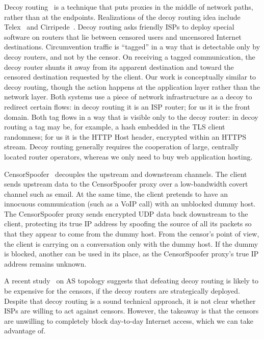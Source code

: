 \documentclass{article}
\begin{document}
Decoy routing~\cite{decoyrouting} is a technique that puts
proxies in the middle of network paths, rather than at the endpoints.
Realizations of the decoy routing idea include Telex~\cite{telex}
and Cirripede~\cite{cirripede}.
Decoy routing asks friendly ISPs to deploy special software on routers that lie
between censored users and uncensored Internet destinations.
Circumvention traffic is ``tagged'' in a way that is detectable only
by decoy routers, and not by the censor.
On receiving a tagged communication, the decoy router shunts it away from its apparent destination
and toward the censored destination requested by the client.
Our work is conceptually similar to decoy routing,
though the action happens at the application layer rather than the network layer.
Both systems use a piece of network infrastructure as a decoy to redirect certain flows:
in decoy routing it is an ISP router; for us it is the front domain.
Both tag flows in a way that is visible only to the decoy router:
in decoy routing a tag may be, for example, a hash embedded in the TLS client randomness;
for us it is the HTTP Host header, encrypted within an HTTPS stream.
Decoy routing generally requires the cooperation of large, centrally located
router operators,
whereas we only need to buy web application hosting.

CensorSpoofer~\cite{censorspoofer}
decouples the upstream and downstream channels.
The client sends upstream data to the CensorSpoofer proxy over a low-bandwidth covert channel such as email.
At the same time, the client pretends to have an innocuous communication (such as a VoIP call) with an unblocked dummy host.
The CensorSpoofer proxy sends encrypted UDP data back downstream to the client,
protecting its true IP address by spoofing the source of all its packets
so that they appear to come from the dummy host.
From the censor's point of view, the client is carrying on a conversation only with the dummy host.
If the dummy is blocked, another can be used in its place,
as the CensorSpoofer proxy's true IP address remains unknown.

\cite{ccs2012-decoys}
A recent study~\cite{nodirectionhome} on AS
topology suggests that defeating decoy routing is likely to be expensive for the
censors, if the decoy routers are strategically deployed. Despite that decoy
routing is a sound technical approach, it is not clear whether ISPs are
willing to act against censors. However, the takeaway is that the
censors are unwilling to completely block day-to-day Internet access, which we
can take advantage of.
\end{document}
